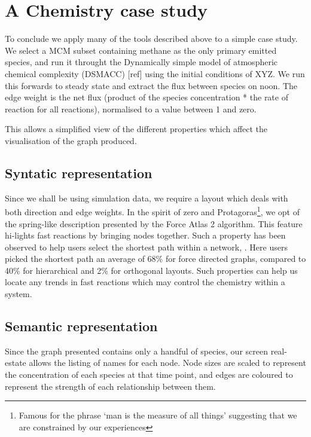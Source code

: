 \section{A Chemistry case study}\label{sec:chemcase}
To conclude we apply many of the tools described above to a simple case study. We select a MCM subset containing methane as the only primary emitted species, and run it throught the Dynamically simple model of atmospheric chemical complexity (DSMACC) [ref] using the initial conditions of XYZ. We run this forwards to steady state and extract the flux between species on noon. The edge weight is the net flux (product of the species concentration * the rate of reaction for all reactions), normalised to a value between 1 and zero. 

This allows a simplified view of the different properties which affect the visualisation of the graph produced. 

\subsection{Syntatic representation} 
Since we shall be using simulation data, we require a layout which deals with both direction and edge weights. In the spirit of zero and Protagoras\footnote{Famous for the phrase `man is the measure of all things' suggesting that we are constrained by our experiences}, we opt of the spring-like description presented by the Force Atlas 2 algorithm. This feature hi-lights fast reactions by bringing nodes together. Such a property has been observed to help users select the shortest path within a network, \cite{eyetrack}. Here users picked the shortest path an average of 68\% for force directed graphs, compared to 40\% for hierarchical and 2\% for orthogonal layouts. Such properties can help us locate any trends in fast reactions which may control the chemistry within a system. 


\subsection{Semantic representation}
Since the graph presented contains only a handful of species, our screen real-estate allows the listing of names for each node. Node sizes are scaled to represent the concentration of each species at that time point, and edges are coloured to represent the strength of each relationship between them. 


